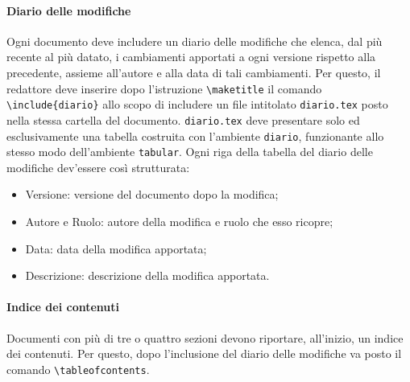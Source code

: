 \paragraph{Diario delle modifiche} Ogni documento deve includere un diario delle modifiche che elenca, dal più recente al più datato, i cambiamenti apportati a ogni versione rispetto alla precedente, assieme all'autore e alla data di tali cambiamenti. Per questo, il redattore deve inserire dopo l'istruzione \texttt{\textbackslash maketitle} il comando \texttt{\textbackslash include\{diario\}} allo scopo di includere un file intitolato \texttt{diario.tex} posto nella stessa cartella del documento. \texttt{diario.tex} deve presentare solo ed esclusivamente una tabella costruita con l'ambiente \texttt{diario}, funzionante allo stesso modo dell'ambiente \texttt{tabular}. Ogni riga della tabella del diario delle modifiche dev'essere così strutturata:
\begin{itemize}
 \item Versione: versione del documento dopo la modifica;
 \item Autore e Ruolo: autore della modifica e ruolo che esso ricopre;
 \item Data: data della modifica apportata;
 \item Descrizione: descrizione della modifica apportata.
\end{itemize}
\paragraph{Indice dei contenuti} Documenti con più di tre o quattro sezioni devono riportare, all'inizio, un indice dei contenuti. Per questo, dopo l'inclusione del diario delle modifiche va posto il comando \texttt{\textbackslash tableofcontents}.
